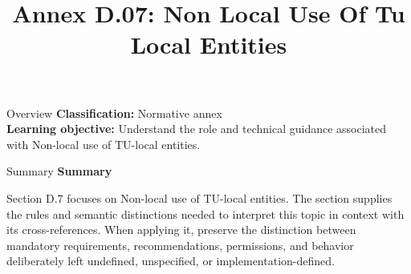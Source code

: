 \documentclass[10pt,letterpaper]{article}
\title{Annex D.07: Non Local Use Of Tu Local Entities}
\author{}
\date{}
\begin{document}
\maketitle
\begin{CornellOverviewBox}{Overview}
\textbf{Classification:} Normative annex\\[2pt]
\textbf{Learning objective:} Understand the role and technical guidance associated with Non-local use of TU-local entities.
\end{CornellOverviewBox}\begin{CornellSummaryBox}{Summary}
{\sffamily\bfseries\color{Accent} Summary}\par\vspace{3pt}Section D.7 focuses on Non-local use of TU-local entities. The section supplies the rules and semantic distinctions needed to interpret this topic in context with its cross-references. When applying it, preserve the distinction between mandatory requirements, recommendations, permissions, and behavior deliberately left undefined, unspecified, or implementation-defined.
\end{CornellSummaryBox}
\end{document}
